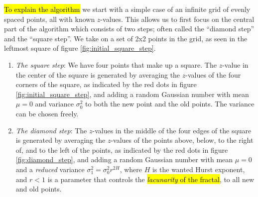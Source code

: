\hl{To explain the algorithm} we start with a simple case of an infinite grid of evenly spaced points, all with known $z$-values. This allows us to first focus on the central part of the algorithm which consists of two steps; often called the ``diamond step'' and the ``square step''. We take on a set of 2x2 points in the grid, as seen in the leftmost square of figure \ref{fig:initial_square_step}.
\begin{enumerate}
    \item \emph{The square step}: We have four points that make up a square. The $z$-value in the center of the square is generated by averaging the $z$-values of the four corners of the square, as indicated by the red dots in figure \ref{fig:initial_square_step}, and adding a random Gaussian number with mean $\mu = 0$ and variance $\sigma_0^2$ to both the new point and the old points. The variance can be chosen freely.
    \label{enum:test}
    
    \item \emph{The diamond step}: The $z$-values in the middle of the four edges of the square is generated by averaging the $z$-values of the points above, below, to the right of, and to the left of the points, as indicated by the red dots in figure \ref{fig:diamond_step}, and adding a random Gaussian number with mean $\mu = 0$ and a \emph{reduced} variance $\sigma_1^2 = \sigma_0^2r^{2H}$, where $H$ is the wanted Hurst exponent, and $r < 1$ is a parameter that controls the \hl{\emph{lacunarity} of the fractal}, to all new and old points.
    
%     
    
    

\end{enumerate}
